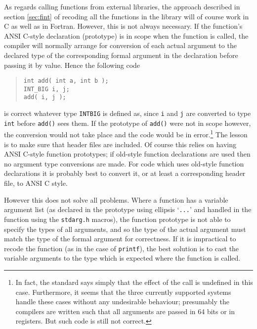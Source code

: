 \documentclass[twoside,11pt]{article}
\renewcommand{\_}{\texttt{\symbol{95}}}
\newcommand{\file}[1]{{\tt #1}}
\newcommand{\cc}[1]{{\tt #1}}
\newenvironment{squote}{\begin{quote}\begin{small}}{\end{small}\end{quote}}
\begin{document}
As regards calling functions from external libraries,
the approach described in section \ref{sec:fint} of 
recoding all the functions in the library will of course work in C
as well as in Fortran.
However, this is not always necessary.
If the function's ANSI C-style declaration (prototype) is in scope when 
the function is called,
the compiler will normally arrange for conversion
of each actual argument to the declared type of
the corresponding formal argument in the declaration 
before passing it by value.
Hence the following code
\begin{squote}
\begin{verbatim}
int add( int a, int b );
INT_BIG i, j;
add( i, j );
\end{verbatim}
\end{squote}
is correct whatever type \cc{INT\_BIG} is defined as, 
since \cc{i} and \cc{j} are converted to type \cc{int}
before \cc{add()} sees them.
If the prototype of \cc{add()} were not in scope however,
the conversion would not take place and the code would be
in error.\footnote{
   In fact, the standard says simply that the effect of the call is
   undefined in this case.  Furthermore, it seems that the three
   currently supported systems handle these cases without
   any undesirable behaviour; presumably the compilers are written
   such that all arguments are passed in 64 bits or in registers.
   But such code is still not correct.
}
The lesson is to make sure that header files are
included.
Of course this relies on having ANSI C-style function prototypes;
if old-style function declarations are used then no argument type
conversions are made.  For code which uses old-style function 
declarations it is probably best to convert it, 
or at least a corresponding header file, 
to ANSI C style.

However this does not solve all problems.
Where a function has a variable argument list
(as declared in the prototype using ellipsis `\cc{...}'
and handled in the function using the \file{stdarg.h} macros), 
the function prototype
is not able to specify the types of all arguments,
and so the type of the actual argument must match the type of
the formal argument for correctness.  If it is impractical
to recode the function (as in the case of \cc{printf}),
the best solution is to cast the variable arguments to the type
which is expected where the function is called.
\end{document}
